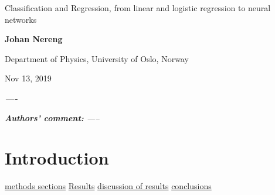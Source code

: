 \documentclass[%
oneside,                 %
final,                   %
10pt]{article}
\begin{document}

\newcommand{\exercisesection}[1]{\subsection*{#1}}






\thispagestyle{empty}

\begin{center}
{\LARGE\bf
\begin{spacing}{1.25}
Classification and Regression, from linear and logistic regression to neural networks
\end{spacing}
}
\end{center}


\begin{center}
{\bf Johan Nereng}
\end{center}

    \begin{center}
\centerline{{\small Department of Physics, University of Oslo, Norway}}
\end{center}
    

\begin{center}
Nov 13, 2019
\end{center}

\vspace{5cm}
\begin{abstract}
-------
\end{abstract}
\newpage




\textit{\textbf{----}} \newline


\textit{\textbf{Authors' comment:} -----}
\newpage

\section{Introduction}
\hyperref[Section_Methods]{methods sections}
\hyperref[Section_Results]{Results}
\hyperref[Section_Discussion_of_results]{discussion of results}
\hyperref[Section_Conclusions]{conclusions}
\end{document}
